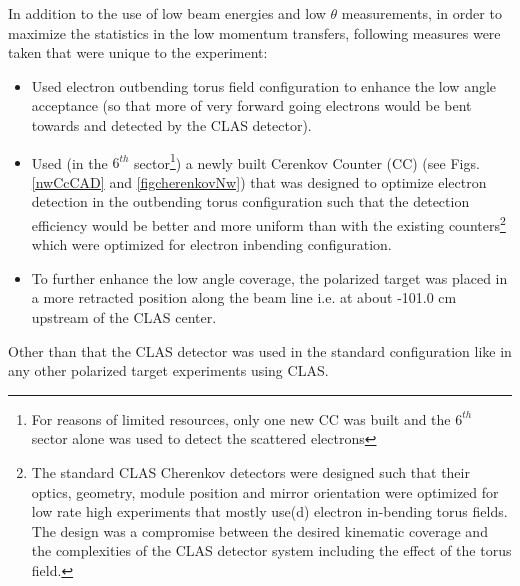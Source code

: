 In addition to the use of low beam energies and low $\theta$ measurements, in order to maximize the statistics in the low momentum transfers, following measures were taken that were unique to the experiment:
\begin{itemize}
\item Used electron outbending torus field configuration to enhance the low angle acceptance (so that more of very forward going electrons would be bent towards and detected by the CLAS detector).
\item Used (in the $6^{th}$ sector\footnote{For reasons of limited resources, only one new CC was built and the $6^{th}$ sector alone was used to detect the scattered electrons}) a newly built Cerenkov Counter (CC) (see Figs. \ref{nwCcCAD} and \ref{figcherenkovNw}) that was designed to optimize electron detection in the outbending torus configuration such that the detection efficiency would be better and more uniform than with the existing counters\footnote{The standard CLAS Cherenkov detectors were designed such that their optics, geometry, module position and mirror orientation were optimized for low rate high \qsq experiments that mostly use(d) electron in-bending torus fields. The design was a compromise between the desired kinematic coverage and the complexities of the CLAS detector system including the effect of the torus field.} which were optimized for electron inbending configuration. 
\item To further enhance the low angle coverage, the polarized target was placed in a more retracted position along the beam line i.e. at about -101.0 cm upstream of the CLAS center.
\end{itemize}

Other than that the CLAS detector was used in the standard configuration like in any other polarized target experiments using CLAS.

